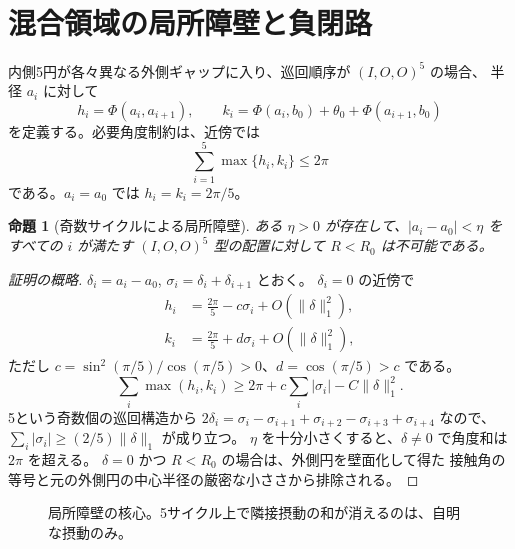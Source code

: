 \documentclass[11pt,a4paper]{article}
\theoremstyle{JPthm}
\newtheorem{proposition}[theorem]{命題}
\theoremstyle{definition}
\newcommand{\Rc}{R_{0}}
\newcommand{\thzero}{\theta_{0}}
\newcommand{\azero}{a_{0}}
\newcommand{\bzero}{b_{0}}
\begin{document}
\section{混合領域の局所障壁と負閉路}
内側5円が各々異なる外側ギャップに入り、巡回順序が $(I,O,O)^5$ の場合、
半径 $a_i$ に対して
\[
 h_i=\Phi(a_i,a_{i+1}),\qquad
 k_i=\Phi(a_i,\bzero)+\thzero+\Phi(a_{i+1},\bzero)
\]
を定義する。必要角度制約は、近傍では
\begin{equation}\label{eq:localbarrier}
 \sum_{i=1}^5\max\{h_i,k_i\}\le2\pi
\end{equation}
である。$a_i=\azero$ では $h_i=k_i=2\pi/5$。
\begin{proposition}[奇数サイクルによる局所障壁]\label{prop:local}
ある $\eta>0$ が存在して、$|a_i-\azero|<\eta$ をすべての $i$ が満たす
$(I,O,O)^5$ 型の配置に対して $R<\Rc$ は不可能である。
\end{proposition}
\begin{proof}[証明の概略]
$\delta_i=a_i-\azero$, $\sigma_i=\delta_i+\delta_{i+1}$ とおく。
$\delta_i=0$ の近傍で
\begin{align*}
 h_i&=\frac{2\pi}{5}-c\sigma_i+O(\|\delta\|_1^2),\\
 k_i&=\frac{2\pi}{5}+d\sigma_i+O(\|\delta\|_1^2),
\end{align*}
ただし $c=\sin^2(\pi/5)/\cos(\pi/5)>0$、$d=\cos(\pi/5)>c$ である。
\[
\sum_i\max(h_i,k_i)\ge2\pi+c\sum_i|\sigma_i|-C\|\delta\|_1^2.
\]
5という奇数個の巡回構造から
$2\delta_i=\sigma_i-\sigma_{i+1}+\sigma_{i+2}-\sigma_{i+3}+\sigma_{i+4}$ なので、
$\sum_i|\sigma_i|\ge(2/5)\|\delta\|_1$ が成り立つ。
$\eta$ を十分小さくすると、$\delta\ne0$ で角度和は $2\pi$ を超える。
$\delta=0$ かつ $R<\Rc$ の場合は、外側円を壁面化して得た
接触角の等号と元の外側円の中心半径の厳密な小ささから排除される。
\end{proof}
\begin{figure}[H]\centering
{}
\caption{局所障壁の核心。5サイクル上で隣接摂動の和が消えるのは、自明な摂動のみ。}
\end{figure}
\end{document}
